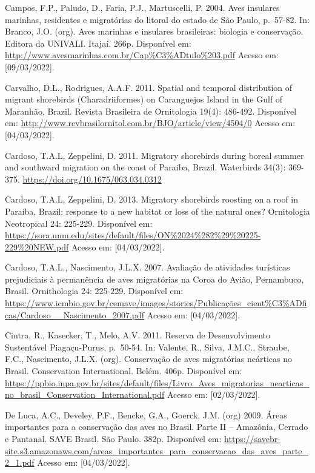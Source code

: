 \documentclass[
  oneside]{scrbook}
\begin{document}
Campos, F.P., Paludo, D., Faria, P.J., Martuscelli, P. 2004. Aves insulares marinhas, residentes e migratórias do litoral do estado de São Paulo, p.~57-82. In: Branco, J.O. (org). Aves marinhas e insulares brasileiras: biologia e conservação. Editora da UNIVALI. Itajaí. 266p. Disponível em: \url{http://www.avesmarinhas.com.br/Cap\%C3\%ADtulo\%203.pdf} Acesso em: {[}09/03/2022{]}.

Carvalho, D.L., Rodrigues, A.A.F. 2011. Spatial and temporal distribution of migrant shorebirds (Charadriiformes) on Caranguejos Island in the Gulf of Maranhão, Brazil. Revista Brasileira de Ornitologia 19(4): 486-492. Disponível em: \url{http://www.revbrasilornitol.com.br/BJO/article/view/4504/0} Acesso em: {[}04/03/2022{]}.

Cardoso, T.A.L, Zeppelini, D. 2011. Migratory shorebirds during boreal summer and southward migration on the coast of Paraiba, Brazil. Waterbirds 34(3): 369-375. \url{https://doi.org/10.1675/063.034.0312}

Cardoso, T.A.L, Zeppelini, D. 2013. Migratory shorebirds roosting on a roof in Paraíba, Brazil: response to a new habitat or loss of the natural ones? Ornitologia Neotropical 24: 225-229. Disponível em: \url{https://sora.unm.edu/sites/default/files/ON\%2024\%282\%29\%20225-229\%20NEW.pdf} Acesso em: {[}04/03/2022{]}.

Cardoso, T.A.L., Nascimento, J.L.X. 2007. Avaliação de atividades turísticas prejudiciais à permanência de aves migratórias na Coroa do Avião, Pernambuco, Brasil. Ornithologia 24: 225-229. Disponível em: \url{https://www.icmbio.gov.br/cemave/images/stories/Publicações_cient\%C3\%ADficas/Cardoso__Nascimento_2007.pdf} Acesso em: {[}04/03/2022{]}.

Cintra, R., Kasecker, T., Melo, A.V. 2011. Reserva de Desenvolvimento Sustentável Piagaçu-Purus, p.~50-54. In: Valente, R., Silva, J.M.C., Straube, F.C., Nascimento, J.L.X. (org). Conservação de aves migratórias neárticas no Brasil. Conservation International. Belém. 406p. Disponível em: \url{https://ppbio.inpa.gov.br/sites/default/files/Livro_Aves_migratorias_nearticas_no_brasil_Conservation_International.pdf} Acesso em: {[}02/03/2022{]}.

De Luca, A.C., Develey, P.F., Bencke, G.A., Goerck, J.M. (org) 2009. Áreas importantes para a conservação das aves no Brasil. Parte II -- Amazônia, Cerrado e Pantanal. SAVE Brasil. São Paulo. 382p. Disponível em: \url{https://savebr-site.s3.amazonaws.com/areas_importantes_para_conservacao_das_aves_parte_2_1.pdf} Acesso em: {[}04/03/2022{]}.
\end{document}
